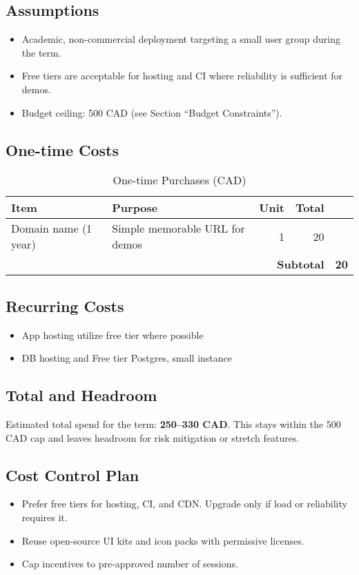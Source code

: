 \documentclass[12pt]{article}
\begin{document}
\subsection{Assumptions}
\begin{itemize}
  \item Academic, non-commercial deployment targeting a small user group during the term.
  \item Free tiers are acceptable for hosting and CI where reliability is sufficient for demos.
  \item Budget ceiling: 500 CAD (see Section ``Budget Constraints'').
\end{itemize}

\subsection{One-time Costs}
\begin{table}[hp]
  \caption{One-time Purchases (CAD)}\label{tab:one_time_costs}
  \begin{tabularx}{\textwidth}{lXrrr}
    \toprule
    \textbf{Item} & \textbf{Purpose} & \textbf{Unit} & \textbf{Total} \\
    \midrule
    Domain name (1 year) & Simple memorable URL for demos & 1 & 20 \\
    \midrule
    \multicolumn{4}{r}{\textbf{Subtotal}} & \textbf{20} \\
    \bottomrule
  \end{tabularx}
\end{table}

\subsection{Recurring Costs}
\begin{itemize}
  \item App hosting utilize free tier where possible
  \item DB hosting and Free tier Postgres, small instance
\end{itemize}

\subsection{Total and Headroom}
\noindent Estimated total spend for the term: \textbf{250--330 CAD}. This stays within the 500 CAD cap and leaves headroom for risk mitigation or stretch features.

\subsection{Cost Control Plan}
\begin{itemize}
  \item Prefer free tiers for hosting, CI, and CDN. Upgrade only if load or reliability requires it.
  \item Reuse open-source UI kits and icon packs with permissive licenses.
  \item Cap incentives to pre-approved number of sessions.
\end{itemize}
\end{document}

